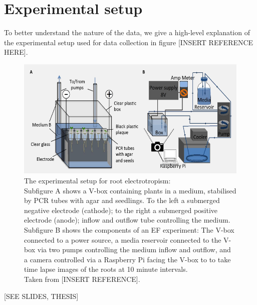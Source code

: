 \section{Experimental setup}

To better understand the nature of the data, we give a high-level explanation of the experimental setup used for data collection in figure [INSERT REFERENCE HERE].

\begin{figure}[H]
	\centering
	\includegraphics[width=\textwidth]{../Figures/experiment_circuit.png}
	\caption{The experimental setup for root electrotropism: \\
		Subfigure A shows a V-box containing plants in a medium, stabilised by PCR tubes with agar and seedlings. To the left a submerged negative electrode (cathode); to the right a submerged positive electrode (anode); inflow and outflow tube controlling the medium. \\
		Subfigure B shows the components of an EF experiment: The V-box connected to a power source, a media reservoir connected to the V-box via two pumps controlling the medium inflow and outflow, and a camera controlled via a Raspberry Pi facing the V-box to to take time lapse images of the roots at 10 minute intervals. \\
		Taken from [INSERT REFERENCE].}
	\label{fig:experiment}
\end{figure}

[SEE SLIDES, THESIS]



